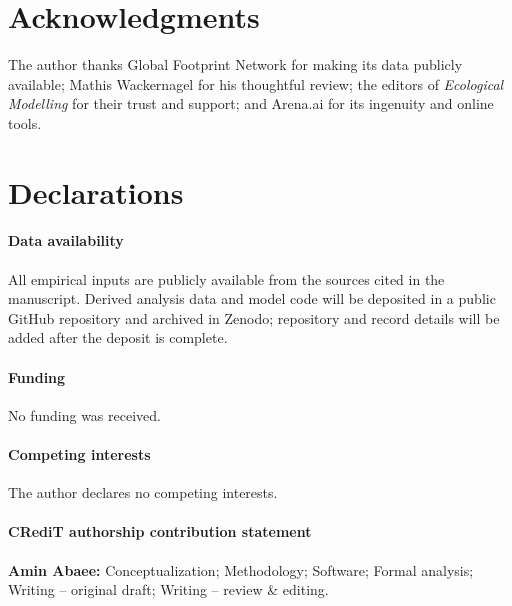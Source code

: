 \documentclass[preprint,12pt,authoryear]{elsarticle}
\begin{document}
\section*{Acknowledgments}

The author thanks Global Footprint Network for making its data publicly available; Mathis Wackernagel for his thoughtful review; the editors of \emph{Ecological Modelling} for their trust and support; and Arena.ai for its ingenuity and online tools.

\section*{Declarations}

\paragraph{Data availability} All empirical inputs are publicly available from the sources cited in the manuscript. Derived analysis data and model code will be deposited in a public GitHub repository and archived in Zenodo; repository and record details will be added after the deposit is complete.

\paragraph{Funding} No funding was received.

\paragraph{Competing interests} The author declares no competing interests.

\paragraph{CRediT authorship contribution statement} \textbf{Amin Abaee:} Conceptualization; Methodology; Software; Formal analysis; Writing -- original draft; Writing -- review \& editing.
\end{document}
